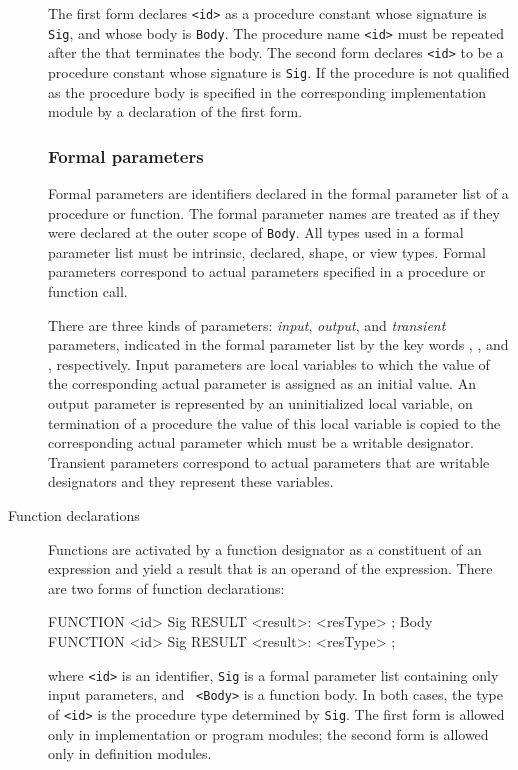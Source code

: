 \begin{description}
The first form declares {\tt <id>} as a procedure constant whose
signature is {\tt Sig}, and whose body is {\tt Body}. The procedure
name {\tt <id>} must be repeated after the  that terminates the
body. The second form declares {\tt <id>} to be a procedure constant
whose signature is {\tt Sig}. If the procedure is not qualified as
 the procedure body is specified in the corresponding
implementation module by a declaration of the first form.


\subsubsection*{Formal parameters}


Formal parameters are identifiers declared in the formal parameter
list of a procedure or function. The formal parameter names are
treated as if they were declared at the outer scope of {\tt Body}.
All types used in a formal parameter list must be intrinsic, declared,
shape, or view types. Formal parameters correspond to actual
parameters specified in a procedure or function call.

There are three kinds of parameters: {\em input}, {\em output}, and
{\em transient} parameters, indicated in the formal parameter list by
the key words , , and , respectively. Input
parameters are local variables to which the value of the corresponding
actual parameter is assigned as an initial value. An output parameter
is represented by an uninitialized local variable, on termination of a
procedure the value of this local variable is copied to the
corresponding actual parameter which must be a writable designator.
Transient parameters correspond to actual parameters that are writable
designators and they represent these variables.

\item[Function declarations] 

Functions are activated by a function designator as a constituent of
an expression and yield a result that is an operand of the expression.
There are two forms of function declarations:

\begin{frag}
FUNCTION <id> Sig RESULT <result>: <resType> ; Body\\
\hlf
[EXTERN] FUNCTION <id> Sig RESULT <result>: <resType> ;
\end{frag}

\noindent where {\tt <id>} is an identifier, {\tt Sig} is a
formal parameter list containing only input parameters, and {\tt
<Body>} is a function body. In both cases, the type of {\tt <id>} is
the procedure type determined by {\tt Sig}. The first form is
allowed only in implementation or program modules; the second form is
allowed only in definition modules.


\end{description}

